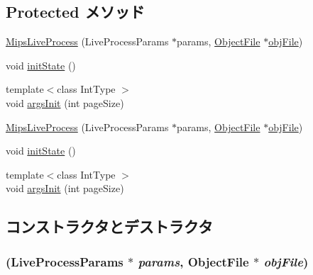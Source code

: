 \subsection*{Protected メソッド}
\begin{DoxyCompactItemize}
\item 
\hyperlink{classMipsLiveProcess_a57e08c5387f25b28fe0c146b0d7c8ab2}{MipsLiveProcess} (LiveProcessParams $\ast$params, \hyperlink{classObjectFile}{ObjectFile} $\ast$\hyperlink{classLiveProcess_ab6cfcfa7903c66267b3e0351c3caa809}{objFile})
\item 
void \hyperlink{classMipsLiveProcess_a3c34ea9b29f410748d4435a667484924}{initState} ()
\item 
{\footnotesize template$<$class IntType $>$ }\\void \hyperlink{classMipsLiveProcess_a2415a441aed245469460cac91152385e}{argsInit} (int pageSize)
\item 
\hyperlink{classMipsLiveProcess_a57e08c5387f25b28fe0c146b0d7c8ab2}{MipsLiveProcess} (LiveProcessParams $\ast$params, \hyperlink{classObjectFile}{ObjectFile} $\ast$\hyperlink{classLiveProcess_ab6cfcfa7903c66267b3e0351c3caa809}{objFile})
\item 
void \hyperlink{classMipsLiveProcess_a3c34ea9b29f410748d4435a667484924}{initState} ()
\item 
{\footnotesize template$<$class IntType $>$ }\\void \hyperlink{classMipsLiveProcess_a2415a441aed245469460cac91152385e}{argsInit} (int pageSize)
\end{DoxyCompactItemize}


\subsection{コンストラクタとデストラクタ}
\hypertarget{classMipsLiveProcess_a57e08c5387f25b28fe0c146b0d7c8ab2}{
\subsubsection[{MipsLiveProcess}]{ (LiveProcessParams $\ast$ {\em params}, \/  {\bf ObjectFile} $\ast$ {\em objFile})}}
\label{classMipsLiveProcess_a57e08c5387f25b28fe0c146b0d7c8ab2}



